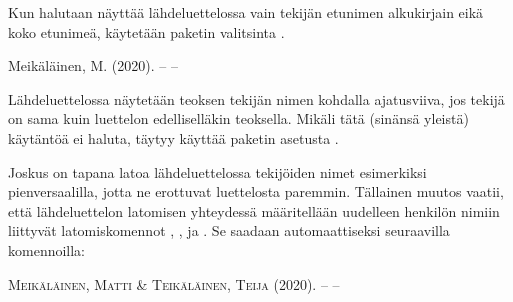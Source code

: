 \begin{koodilohkosis}
\usepackage[style=authoryear, maxbibnames=99, minbibnames=3,
  maxcitenames=3, mincitenames=1, uniquelist=true]{biblatex}
\end{koodilohkosis}

Kun halutaan näyttää lähdeluettelossa vain tekijän etunimen alkukirjain
eikä koko etunimeä, käytetään paketin valitsinta .

\begin{koodilohkosis}
\usepackage[…, giveninits]{biblatex}
\end{koodilohkosis}

\begin{tulossis}
  Meikäläinen, M. (2020). -- --
\end{tulossis}

Lähdeluettelossa näytetään teoksen tekijän nimen kohdalla ajatusviiva,
jos tekijä on sama kuin luettelon edelliselläkin teoksella. Mikäli tätä
(sinänsä yleistä) käytäntöä ei haluta, täytyy käyttää paketin asetusta
.

\begin{koodilohkosis}
\usepackage[…, dashed=false]{biblatex}
\end{koodilohkosis}

Joskus on tapana latoa lähdeluettelossa tekijöiden nimet esimerkiksi
pienversaalilla, jotta ne erottuvat luettelosta paremmin. Tällainen
muutos vaatii, että lähdeluettelon latomisen yhteydessä määritellään
uudelleen henkilön nimiin liittyvät latomiskomennot
, ,
 ja . Se saadaan
automaattiseksi seuraavilla komennoilla:

\begin{koodilohkosis}
\end{koodilohkosis}

\begin{tulossis}
  \textsc{Meikäläinen}, \textsc{Matti} \& \textsc{Teikäläinen},
  \textsc{Teija} (2020). -- --
\end{tulossis}

